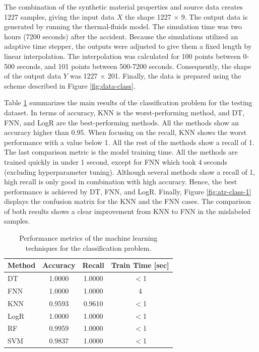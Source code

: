 The combination of the synthetic material properties and source data creates 1227 samples, giving the input data $X$ the shape 1227 $\times$ 9.
The output data is generated by running the thermal-fluids model.
The simulation time was two hours (7200 seconds) after the accident.
Because the simulations utilized an adaptive time stepper, the outputs were adjusted to give them a fixed length by linear interpolation.
The interpolation was calculated for 100 points between 0-500 seconds, and 101 points between 500-7200 seconds.
Consequently, the shape of the output data $Y$ was 1227 $\times$ 201.
Finally, the data is prepared using the scheme described in Figure \ref{fig:data-class}.

Table \ref{tab:results-atr} summarizes the main results of the classification problem for the testing dataset.
In terms of accuracy, KNN is the worst-performing method, and DT, FNN, and LogR are the best-performing methods.
All the methods show an accuracy higher than 0.95.
When focusing on the recall, KNN shows the worst performance with a value below 1.
All the rest of the methods show a recall of 1.
The last comparison metric is the model training time.
All the methods are trained quickly in under 1 second, except for FNN which took 4 seconds (excluding hyperparameter tuning).
Although several methods show a recall of 1, high recall is only good in combination with high accuracy.
Hence, the best performance is achieved by DT, FNN, and LogR.
Finally, Figure \ref{fig:atr-class-1} displays the confusion matrix for the KNN and the FNN cases.
The comparison of both results shows a clear improvement from KNN to FNN in the mislabeled samples.

\begin{table}[htbp!]
  \centering
  \caption{Performance metrics of the machine learning techniques for the classification problem.}
  \label{tab:results-atr}
  \begin{tabular}{lccc}
    \toprule
    Method & Accuracy & Recall & Train Time [sec] \\
    \midrule
    DT      & 1.0000 & 1.0000 & $<$1 \\
    FNN     & 1.0000 & 1.0000 & 4 \\
    KNN     & 0.9593 & 0.9610 & $<$1 \\
    LogR    & 1.0000 & 1.0000 & $<$1 \\
    RF      & 0.9959 & 1.0000 & $<$1 \\
    SVM     & 0.9837 & 1.0000 & $<$1 \\
    \bottomrule
  \end{tabular}
\end{table}


